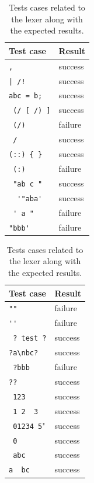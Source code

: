 \documentclass[english,bachelors,forcepolishlogotype]{wizthesis}
\begin{document}
\begin{table}[H]
  \centering
  \caption{Tests cases related to the lexer along with the expected results.}
  \label{tab:lexer-test-cases}
  \begin{tabular}{@{}ll@{}}
    \toprule
    Test case & Result \\ \midrule
    \verb*@,@                    & success \\
    \verb*@| /!@                 & success \\
    \verb*@abc = b;@             & success \\
    \verb*@ (/ [ /) ]@           & success \\
    \verb*@ (/) @                & failure \\
    \verb*@ /@                   & success \\
    \verb*@(::) { } @            & success \\
    \verb*@ (:) @                & failure \\
    \verb*@ "ab c " @            & success \\
    \verb*@  '"aba' @            & success \\
    \verb*@ ' a "@               & failure \\
    \verb*@"bbb'   @             & failure \\ \bottomrule
  \end{tabular}
  \hspace{0.5cm}
  \begin{tabular}{@{}ll@{}}
    \toprule
    Test case & Result \\ \midrule
    \verb*@""@                   & failure \\
    \verb*@''@                   & failure \\
    \verb*@ ? test ?@            & success \\
    \verb*@?a\nbc?  @            & success \\
    \verb*@ ?bbb  @              & failure \\
    \verb*@??@                   & success \\
    \verb*@ 123 @                & success \\
    \verb*@ 1 2  3  @            & success \\
    \verb*@ 01234 5@"            & success \\
    \verb*@ 0 @                  & success \\
    \verb*@ abc @                & success \\
    \verb*@a  bc @               & success \\ \bottomrule

\end{tabular}
\end{table}
\end{document}

